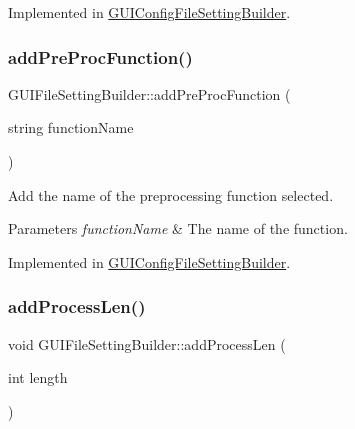 Implemented in \mbox{\hyperlink{class_g_u_i_config_file_setting_builder_aadf2b48c000de4e7dc8d060d486a81b7}{G\+U\+I\+Config\+File\+Setting\+Builder}}.

\mbox{\label{class_g_u_i_file_setting_builder_ad1b6098cd9d6f18d1aaf4ab3af87d9df}} 
\subsubsection{\texorpdfstring{add\+Pre\+Proc\+Function()}{addPreProcFunction()}}
{\footnotesize\ttfamily G\+U\+I\+File\+Setting\+Builder\+::add\+Pre\+Proc\+Function (\begin{DoxyParamCaption}\item[{string}]{function\+Name }\end{DoxyParamCaption})\hspace{0.3cm}{\ttfamily [pure virtual]}}



Add the name of the preprocessing function selected. 


\begin{DoxyParams}{Parameters}
{\em function\+Name} & The name of the function. \\
\hline
\end{DoxyParams}


Implemented in \mbox{\hyperlink{class_g_u_i_config_file_setting_builder_afc97c2bd21304022f9a658325b58bf27}{G\+U\+I\+Config\+File\+Setting\+Builder}}.

\mbox{\label{class_g_u_i_file_setting_builder_a958259a35215b686477839872752a0dc}} 
\subsubsection{\texorpdfstring{add\+Process\+Len()}{addProcessLen()}}
{\footnotesize\ttfamily void G\+U\+I\+File\+Setting\+Builder\+::add\+Process\+Len (\begin{DoxyParamCaption}\item[{int}]{length }\end{DoxyParamCaption})\hspace{0.3cm}{\ttfamily [pure virtual]}}



